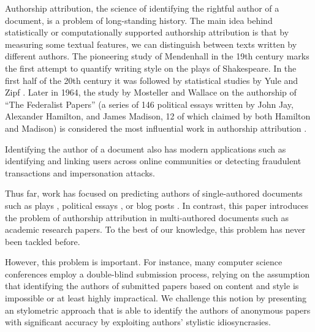 
Authorship attribution, the science of identifying the rightful author of a document,
is a problem of long-standing history.
The main idea behind statistically or computationally supported authorship attribution is that by measuring some textual features, we can distinguish between texts written by different authors.
The pioneering study of Mendenhall \cite{mendenhall1887characteristic} in the 19th century marks the first attempt to quantify writing style on the plays of Shakespeare.
In the first half of the 20th century it was followed by statistical studies by Yule \cite{yule1939sentence,yule1944statistical} and Zipf \cite{zipf1932selected}. 
Later in 1964, the study by Mosteller and Wallace \cite{mosteller1964inference} on the authorship of ``The Federalist Papers'' (a series of 146 political essays written by John Jay, Alexander Hamilton, and James Madison, 12 of which claimed by both Hamilton and Madison) is considered the most influential work in authorship attribution \cite{stamatatos2009survey}. 

Identifying the author of a document also has modern applications such as identifying and linking users across online communities or detecting fraudulent transactions and impersonation attacks.

Thus far, work has focused on predicting authors of single-authored documents such as plays \cite{mendenhall1887characteristic,matthews1993neural,merriam1994neural}, political essays \cite{mosteller1964inference}, or blog posts \cite{narayanan2012feasibility}.
In contrast, this paper introduces the problem of authorship attribution in multi-authored documents such as academic research papers.
To the best of our knowledge, this problem has never been tackled before.

However, this problem is important. 
For instance, many computer science conferences employ a double-blind submission process, relying on the assumption that identifying the authors of submitted papers based on content and style is impossible or at least highly impractical. 
We challenge this notion by presenting an stylometric approach that is able to identify the authors of anonymous papers with significant accuracy by exploiting authors' stylistic idiosyncrasies.

